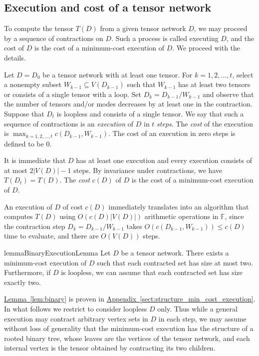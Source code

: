 \documentclass[11pt]{article}
\numberwithin{equation}{section}
\theoremstyle{definition}
\theoremstyle{plain}
\newcommand{\expref}[2]{\hyperref[#2]{#1~\ref{#2}}}
\newcommand{\F}{\ensuremath{\mathbb{F}}}
\begin{document}
\subsection{Execution and cost of a tensor network}

To compute the tensor $T(D)$ from a given tensor network $D$,
we may proceed by a sequence of contractions on $D$. Such a process is called
executing $D$, and the cost of $D$ is the cost of a minimum-cost execution of $D$. We proceed with the details.

Let $D=D_0$ be a tensor network with at least one tensor.
For $k=1,2,\ldots,t$, select a nonempty
subset $W_{k-1}\subseteq V(D_{k-1})$ such that $W_{k-1}$ has at least two
tensors or consists of a single tensor with a loop.
Set $D_k=D_{k-1}/W_{k-1}$ and observe that the number of tensors and/or modes
decreases by at least one in the contraction.
Suppose that $D_t$ is loopless and consists of a single tensor.
We say that such a sequence of contractions is an \emph{execution} of $D$
in $t$ \emph{steps}.
The \emph{cost} of the execution is
$\max_{k=1,2,\ldots,t} c(D_{k-1},W_{k-1})$.
The cost of an execution in zero steps is defined to be $0$.

It is immediate that $D$ has at least one execution and every
execution consists of at most $2|V(D)|-1$ steps.  By invariance under
contractions, we have $T(D_t) = T(D)$.
The \emph{cost} $c(D)$ of $D$ is the cost of a minimum-cost execution of $D$.

An execution of $D$ of cost $c(D)$ immediately translates into an
algorithm that computes $T(D)$ using $O(c(D)|V(D)|)$ arithmetic
operations in $\F$, since the contraction step $D_{k} =
D_{k-1}/W_{k-1}$ takes $O(c(D_{k-1}, W_{k-1})) \le c(D)$ time to
evaluate, and there are $O(V(D))$ steps.

\begin{restatable}{lemma}{BinaryExecutionLemma}
\label{lem:binary}
Let $D$ be a tensor network.
There exists a minimum-cost execution of $D$ such that each contracted
set has size at most two. Furthermore, if $D$ is loopless,
we can assume that each contracted set has size exactly two.
\end{restatable}

\expref{Lemma}{lem:binary}  is proven in \expref{Appendix}{sect:structure_min_cost_execution}.
In what follows we restrict to consider loopless $D$ only.
Thus while a general execution may contract arbitrary vertex sets in
$D$ in each step, we may assume without loss of generality that
the minimum-cost execution has the structure of a rooted binary tree,
whose leaves are the vertices of the tensor network, and each internal
vertex is the tensor obtained by contracting its two children.
\end{document}

